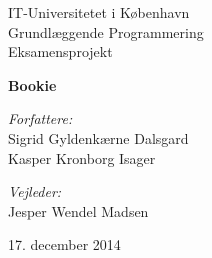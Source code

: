 


\begin{titlepage}

\center

\LARGE{IT-Universitetet i København}\\[1.5cm]
\Large{Grundlæggende Programmering}\\[0.5cm]
\large{Eksamensprojekt}

\vfill

\huge{\bfseries Bookie}

\vfill

\begin{minipage}[t]{0.4\textwidth}
\begin{flushleft} \large
  \emph{Forfattere:}\\
  Sigrid Gyldenkærne Dalsgard \\
  Kasper Kronborg Isager
\end{flushleft}
\end{minipage}
\begin{minipage}[t]{0.4\textwidth}
\begin{flushright} \large
  \emph{Vejleder:} \\
  Jesper Wendel Madsen
\end{flushright}
\end{minipage}

\vfill

\large{17. december 2014}

\end{titlepage}
